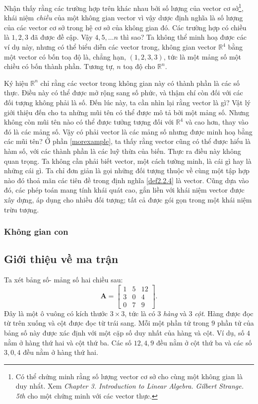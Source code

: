 Nhận thấy rằng các trường hợp trên khác nhau bởi số lượng của vector cơ sở\footnote{Có thể chứng minh rằng số lượng vector cơ sở cho cùng một không gian là duy nhẩt. Xem \emph{Chapter 3. Introduction to Linear Algebra. Gilbert Strange. 5th} cho một chứng minh với các vector thực.}, khái niệm \emph{chiều} của một không gian vector vì vậy dược định nghĩa là số lượng của các vector cơ sở trong hệ cơ sở của không gian đó. Các trường hợp có chiều là \(1,2,3\) đã được đề cập. Vậy \(4,5,\dots n\) thì sao? Ta không thể minh hoạ được các ví dụ này, nhưng có thể biểu diễn các vector trong, không gian vector \(\mathbb{R}^4\) bằng một vector có bốn toạ độ là, chẳng hạn, \((1,2,3,3)\), tức là một mảng số một chiều có bốn thành phần. Tương tự, \(n\) toạ độ cho \(\mathbb{R}^n\).
\vspace{8pt}

Ký hiệu \(\mathbb{R}^n\) chỉ rằng các vector trong không gian này có thành phần là các số thực. Điều này có thể được mở rộng sang số phức, và thậm chí còn đối với các đối tượng không phải là số. Đến lúc này, ta cần nhìn lại rằng vector là gì? Vật lý giới thiệu đến cho ta những mũi tên có thể được mô tả bởi một mảng số. Nhưng không còn mũi tên nào có thể được tưởng tượng đối với 
\(\mathbb{R}^4\) và cao hơn, thay vào đó là các mảng số. Vậy có phải vector là các mảng số nhưng được minh hoạ bằng các mũi tên? Ở phần \ref{morexample}, ta thấy rằng vector cũng có thể được hiểu là hàm số, với các thành phần là các luỹ thừa của biến. Thực ra điều này không quan trọng. 
Ta không cần phải biết vector, một cách tường minh, là cái gì hay là những cái gì. Ta chỉ đơn giản là gọi những đối tượng thuộc về cùng một tập hợp nào đó thoả mãn các tiên đề trong định nghĩa \ref{def2.2.4} là vector. Cũng dựa vào đó, các phép toán mang tính khái quát cao, gắn liền với khái niệm vector được xây dựng, áp dụng cho nhiều đối tượng; tất cả được gói gọn trong một khái niệm trừu tượng.

\subsubsection*{Không gian con}



\subsection{Giới thiệu về ma trận}
Ta xét bảng số- mảng số hai chiều sau:
\[ \mathbf{A}=
\begin{bmatrix}
    1&5&12\\
    3&0&4\\
    0&7&9
\end{bmatrix}.
\]
Đây là một ô vuông có kích thước \(3\times 3\), tức là có \(3\) \emph{hàng} và \(3\) \emph{cột}. Hàng được đọc từ trên xuống và cột được đọc từ trái sang. Mỗi một phần tử  trong \(9\) phần tử  của bảng số này được xác định với một cặp số duy nhất của hàng và cột. Ví dụ, số \(4\) nằm ở hàng thứ hai và cột thứ ba. 
Các số \(12,4,9\) đều nằm ở cột thứ ba và các số \(3,0,4\) đều nằm ở hàng thứ hai. 

